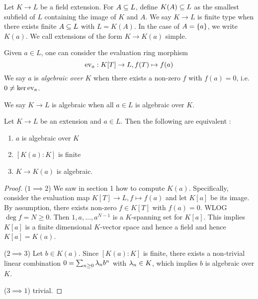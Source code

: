 \documentclass{article}
\begin{document}
\begin{dfn}
  
  Let $K \to L$ be a field extension.
  For $A \subseteq L$, define $K(A) \subseteq L$ as the smallest
  subfield of $L$ containing the image of $K$ and $A$.
  We say $K \to L$ is finite type when 
  there exists finite $A \subseteq L$ with $L = K(A)$.
  In the case of $A = \left\{a\right\}$, we write $K(a)$.
  We call extensions of the form $K \to K(a)$ simple.

  Given $a \in L$, one can consider the evaluation 
  ring morphism \[
    \operatorname{ev}_a : K[T] \to L , f(T) \mapsto f(a)
  \]
  We say $a$ is \emph{algebraic over $K$} when
  there exists a non-zero $f$ with $f(a) = 0$,
  i.e. $0 \neq \ker \operatorname{ev}_a$.
  
  We say $K \to L$ is algebraic when
  all $a \in L$ is algebraic over $K$.
\end{dfn}

\begin{prop}
  Let $K \to L$ be an extension and $a \in L$.
  Then the following are equivalent : 
  \begin{enumerate}
    \item $a$ is algebraic over $K$
    \item $[K(a) : K]$ is finite
    \item $K \to K(a)$ is algebraic.
  \end{enumerate}
\end{prop}
\begin{proof}
  ($1 \implies 2$) 
  We saw in section 1 how to compute $K(a)$.
  Specifically, consider the evaluation map $K[T] \to L , f \mapsto f(a)$
  and let $K[a]$ be its image.
  By assumption, there exists non-zero $f \in K[T]$ with $f(a) = 0$.
  WLOG $\deg f = N \geq 0$.
  Then $1 , a , \dots, a^{N-1}$ is a $K$-spanning set for $K[a]$.
  This implies $K[a]$ is a finite dimensional $K$-vector space
  and hence a field and hence $K[a] = K(a)$.

  ($2 \implies 3$)
  Let $b \in K(a)$.
  Since $[K(a) : K]$ is finite,
  there exists a non-trivial linear combination
  $0 = \sum_{n \geq 0} \lambda_n b^n$ with $\lambda_n \in K$,
  which implies $b$ is algebraic over $K$.

  ($3 \implies 1$) trivial.
\end{proof}
\end{document}
